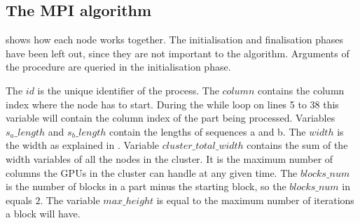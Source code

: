 \subsection{The MPI algorithm}
 shows how each node works together.
The initialisation and finalisation phases have been left out, since they are not important to the algorithm.
Arguments of the procedure are queried in the initialisation phase.

The $id$ is the unique identifier of the process.
The $column$ contains the column index where the node has to start. During the while loop on lines 5 to 38 this variable will contain the column index of the part being processed.
Variables $s_a\_length$ and $s_b\_length$ contain the lengths of sequences a and b.
The $width$ is the width as explained in .
Variable $cluster\_total\_width$ contains the sum of the width variables of all the nodes in the cluster.
It is the maximum number of columns the GPUs in the cluster can handle at any given time.
The $blocks\_num$ is the number of blocks in a part minus the starting block, so the $blocks\_num$ in  equals $2$.
The variable $max\_height$ is equal to the maximum number of iterations a block will have.



